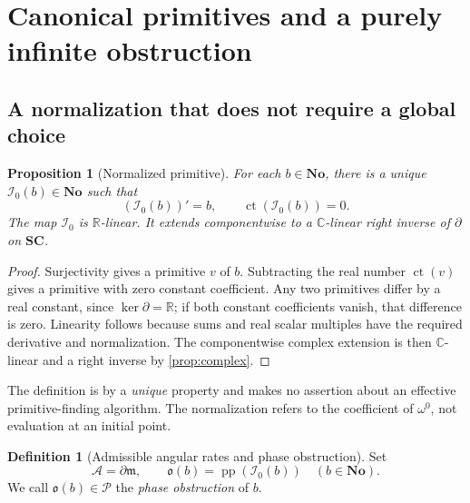 \documentclass[11pt,letterpaper]{article}
\numberwithin{equation}{section}
\newtheorem{proposition}[proposition]{Proposition}
\theoremstyle{definition}
\newtheorem{definition}[definition]{Definition}
\theoremstyle{remark}
\newcommand{\No}{\mathbf{No}}
\newcommand{\SC}{\mathbf{SC}}
\newcommand{\R}{\mathbb R}
\newcommand{\C}{\mathbb C}
\newcommand{\mm}{\mathfrak m}
\newcommand{\PPi}{\mathcal P}
\newcommand{\ARate}{\mathcal A}
\newcommand{\der}{\partial}
\newcommand{\pp}{\operatorname{pp}}
\newcommand{\ct}{\operatorname{ct}}
\newcommand{\Izero}{\mathcal I_0}
\newcommand{\Obs}{\mathfrak o}
\begin{document}
\section{Canonical primitives and a purely infinite obstruction}\label{sec:obstruction}

\subsection{A normalization that does not require a global choice}
\begin{proposition}[Normalized primitive]\label{prop:I0}
For each $b\in\No$, there is a unique $\Izero(b)\in\No$ such that
\[
 (\Izero(b))'=b,\qquad\ct(\Izero(b))=0.
\]
The map $\Izero$ is $\R$-linear. It extends componentwise to a $\C$-linear right inverse of $\der$ on $\SC$.
\end{proposition}
\begin{proof}
Surjectivity gives a primitive $v$ of $b$. Subtracting the real number $\ct(v)$ gives a primitive with zero constant coefficient. Any two primitives differ by a real constant, since $\ker\der=\R$; if both constant coefficients vanish, that difference is zero. Linearity follows because sums and real scalar multiples have the required derivative and normalization. The componentwise complex extension is then $\C$-linear and a right inverse by \cref{prop:complex}.
\end{proof}

The definition is by a \emph{unique} property and makes no assertion about an effective primitive-finding algorithm. The normalization refers to the coefficient of $\omega^0$, not evaluation at an initial point.

\begin{definition}[Admissible angular rates and phase obstruction]\label{def:obs}
Set
\[
 \ARate=\der\mm,\qquad
 \Obs(b)=\pp(\Izero(b))\quad(b\in\No).
\]
We call $\Obs(b)\in\PPi$ the \emph{phase obstruction} of $b$.
\end{definition}
\end{document}
